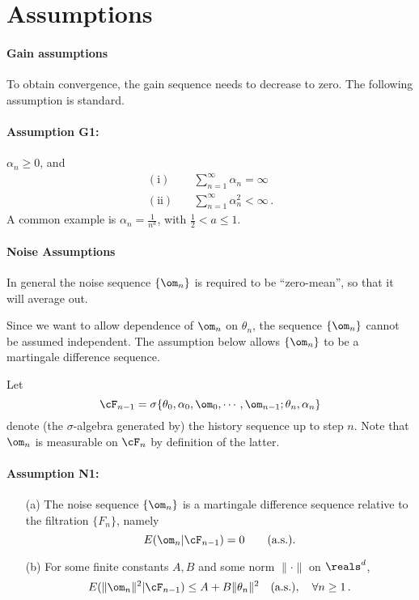 \section{Assumptions}

\paragraph{Gain assumptions}

To obtain convergence, the gain sequence needs to decrease to zero.
The following assumption is standard.

\paragraph{Assumption G1:}  $\alpha_n \ge 0$, and
\begin{align*}
\mathrm{(i)} \quad & \sum_{n=1}^\infty \alpha_n = \infty\\
\mathrm{(ii)} \quad& \sum_{n=1}^\infty \alpha_n^2 < \infty\,.
\end{align*}
A common example is  $\displaystyle{\alpha_n=\frac{1}{n^a}}$, with
$\frac{1}{2} < a \le 1$.

\paragraph{Noise Assumptions}

In general the noise sequence $\{\om_n\}$ is required to be ``zero-mean'',
so that it will average out.

Since we want to allow dependence
of $\om_n$ on $\theta_n$, the sequence $\{\om_n\}$ cannot be assumed
independent. The assumption below allows $\{\om_n\}$ to be a martingale
difference sequence.

Let
$$
\cF_{n-1} = \sigma \{ \theta_0, \alpha_0, \om_0, \cdots, \om_{n-1};
\theta_n, \alpha_n\}
$$
denote (the $\sigma$-algebra generated by) the history sequence up to
step $n$. Note that $\om_n$ is measurable on $\cF_n$ by definition of the latter.

\paragraph{Assumption N1:}
\begin{itemize}
\item[(a)]
The noise sequence $\{\om_n\}$ is a martingale difference sequence relative to the
filtration $\{F_n\}$, namely
$$
E(\om_n | \cF_{n-1}) = 0 \qquad \text{(a.s.)}.
$$
\item[(b)] For some finite constants $A,B$ and some norm $\|\cdot \|$ on $\reals^d$,
$$E(\| \om_n\|^2 | \cF_{n-1}) \le A + B \| \theta_n\|^2 \quad \text{(a.s.)},
\quad \forall n\ge 1\,.$$
\end{itemize}

